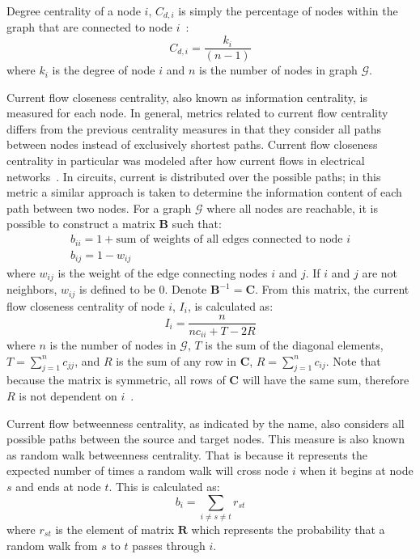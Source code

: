 \documentclass[12pt]{report}
\begin{document}
Degree centrality of a node $i$, $C_{d,i}$ is simply the percentage of nodes within the graph that are connected to node $i$~\cite{borgatti2011analyzing}:
\begin{equation}
C_{d,i} = \frac{k_i}{(n-1)}
\end{equation}
where $k_i$ is the degree of node $i$ and $n$ is the number of nodes in graph $\mathcal{G}$.

Current flow closeness centrality, also known as information centrality, is measured for each node.
In general, metrics related to current flow centrality differs from the previous centrality measures in that they consider all paths between nodes instead of exclusively shortest paths.
Current flow closeness centrality in particular was modeled after how current flows in electrical networks~\cite{brandes2005centrality}.
In circuits, current is distributed over the possible paths; in this metric a similar approach is taken to determine the information content of each path between two nodes.
For a graph $\mathcal{G}$ where all nodes are reachable, it is possible to construct a matrix $\boldsymbol{B}$ such that:
\begin{gather}
b_{ii} = 1 + \text{sum of weights of all edges connected to node } i \\
b_{ij} = 1- w_{ij}
\end{gather}
where $w_{ij}$ is the weight of the edge connecting nodes $i$ and $j$.
If $i$ and $j$ are not neighbors, $w_{ij}$ is defined to be $0$.
Denote $\boldsymbol{B}^{-1} = \boldsymbol{C}$.
From this matrix, the current flow closeness centrality of node $i$, $I_i$, is calculated as:
\begin{equation}
I_i = \frac{n}{nc_{ii}+T-2R}
\end{equation}
where $n$ is the number of nodes in $\mathcal{G}$, $T$ is the sum of the diagonal elements, $T = \sum_{j=1}^nc_{jj}$, and $R$ is the sum of any row in $\boldsymbol{C}$, $R = \sum_{j=1}^nc_{ij}$.
Note that because the matrix is symmetric, all rows of $\boldsymbol{C}$ will have the same sum, therefore $R$ is not dependent on $i$~\cite{stephenson1989rethinking}.

Current flow betweenness centrality, as indicated by the name, also considers all possible paths between the source and target nodes.
This measure is also known as random walk betweenness centrality.
That is because it represents the expected number of times a random walk will cross node ${i}$ when it begins at node ${s}$ and ends at node ${t}$.
This is calculated as:
\begin{equation}
b_i = \sum_{i\neq s\neq t} r_{st}
\end{equation}
where $r_{st}$ is the element of matrix $\boldsymbol{R}$ which represents the probability that a random walk from $s$ to $t$ passes through $i$.
\end{document}
